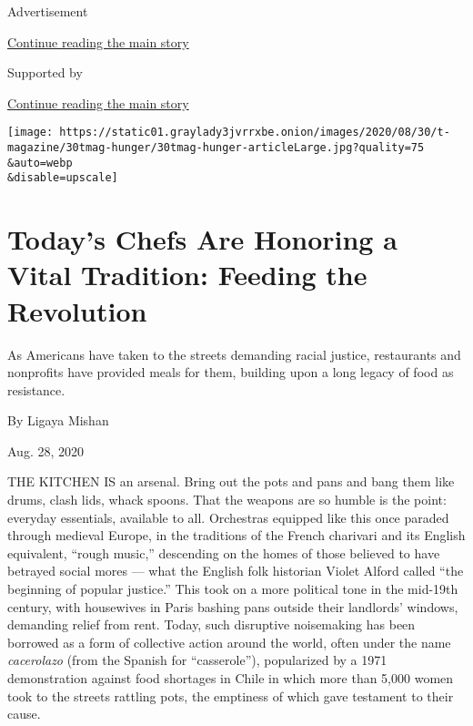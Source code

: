 Advertisement

\protect\hyperlink{after-top}{Continue reading the main story}

Supported by

\protect\hyperlink{after-sponsor}{Continue reading the main story}

\texttt{[image: https://static01.graylady3jvrrxbe.onion/images/2020/08/30/t-magazine/30tmag-hunger/30tmag-hunger-articleLarge.jpg?quality=75\\\&auto=webp\\\&disable=upscale]}

\hypertarget{todays-chefs-are-honoring-a-vital-tradition-feeding-the-revolution}{%
\section{Today's Chefs Are Honoring a Vital Tradition: Feeding the
Revolution}\label{todays-chefs-are-honoring-a-vital-tradition-feeding-the-revolution}}

As Americans have taken to the streets demanding racial justice,
restaurants and nonprofits have provided meals for them, building upon a
long legacy of food as resistance.

By Ligaya Mishan

Aug. 28, 2020

THE KITCHEN IS an arsenal. Bring out the pots and pans and bang them
like drums, clash lids, whack spoons. That the weapons are so humble is
the point: everyday essentials, available to all. Orchestras equipped
like this once paraded through medieval Europe, in the traditions of the
French charivari and its English equivalent, ``rough music,'' descending
on the homes of those believed to have betrayed social mores --- what
the English folk historian Violet Alford called ``the beginning of
popular justice.'' This took on a more political tone in the mid-19th
century, with housewives in Paris bashing pans outside their landlords'
windows, demanding relief from rent. Today, such disruptive noisemaking
has been borrowed as a form of collective action around the world, often
under the name \emph{cacerolazo} (from the Spanish for ``casserole''),
popularized by a 1971 demonstration against food shortages in Chile in
which more than 5,000 women took to the streets rattling pots, the
emptiness of which gave testament to their cause.

